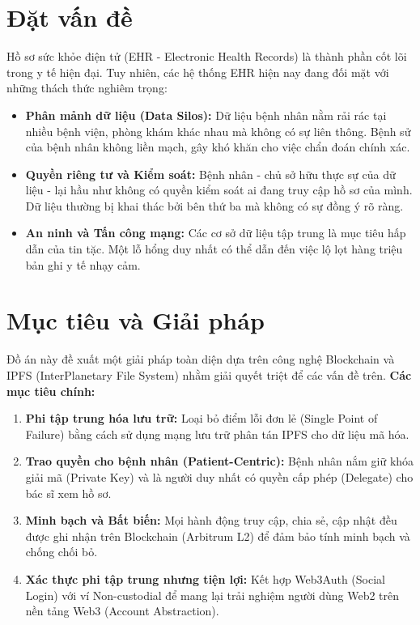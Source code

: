 \documentclass[12pt,a4paper]{report}
\begin{document}
\section{Đặt vấn đề}
Hồ sơ sức khỏe điện tử (EHR - Electronic Health Records) là thành phần cốt lõi trong y tế hiện đại. Tuy nhiên, các hệ thống EHR hiện nay đang đối mặt với những thách thức nghiêm trọng:
\begin{itemize}
    \item \textbf{Phân mảnh dữ liệu (Data Silos):} Dữ liệu bệnh nhân nằm rải rác tại nhiều bệnh viện, phòng khám khác nhau mà không có sự liên thông. Bệnh sử của bệnh nhân không liền mạch, gây khó khăn cho việc chẩn đoán chính xác.
    \item \textbf{Quyền riêng tư và Kiểm soát:} Bệnh nhân - chủ sở hữu thực sự của dữ liệu - lại hầu như không có quyền kiểm soát ai đang truy cập hồ sơ của mình. Dữ liệu thường bị khai thác bởi bên thứ ba mà không có sự đồng ý rõ ràng.
    \item \textbf{An ninh và Tấn công mạng:} Các cơ sở dữ liệu tập trung là mục tiêu hấp dẫn của tin tặc. Một lỗ hổng duy nhất có thể dẫn đến việc lộ lọt hàng triệu bản ghi y tế nhạy cảm.
\end{itemize}

\section{Mục tiêu và Giải pháp}
Đồ án này đề xuất một giải pháp toàn diện dựa trên công nghệ Blockchain và IPFS (InterPlanetary File System) nhằm giải quyết triệt để các vấn đề trên.
\textbf{Các mục tiêu chính:}
\begin{enumerate}
    \item \textbf{Phi tập trung hóa lưu trữ:} Loại bỏ điểm lỗi đơn lẻ (Single Point of Failure) bằng cách sử dụng mạng lưu trữ phân tán IPFS cho dữ liệu mã hóa.
    \item \textbf{Trao quyền cho bệnh nhân (Patient-Centric):} Bệnh nhân nắm giữ khóa giải mã (Private Key) và là người duy nhất có quyền cấp phép (Delegate) cho bác sĩ xem hồ sơ.
    \item \textbf{Minh bạch và Bất biến:} Mọi hành động truy cập, chia sẻ, cập nhật đều được ghi nhận trên Blockchain (Arbitrum L2) để đảm bảo tính minh bạch và chống chối bỏ.
    \item \textbf{Xác thực phi tập trung nhưng tiện lợi:} Kết hợp Web3Auth (Social Login) với ví Non-custodial để mang lại trải nghiệm người dùng Web2 trên nền tảng Web3 (Account Abstraction).
\end{enumerate}
\end{document}
